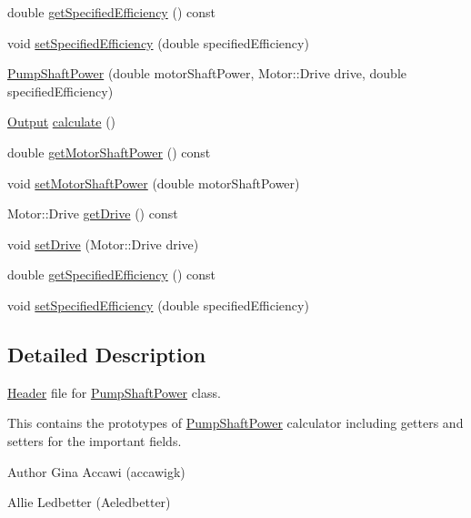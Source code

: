 \begin{DoxyCompactItemize}
\item 
double \hyperlink{class_pump_shaft_power_a93c70d2b6f70d6d98b97859fc095193a}{get\+Specified\+Efficiency} () const
\item 
void \hyperlink{class_pump_shaft_power_a7d2c64ba11fb287d9b46f7d0890ee988}{set\+Specified\+Efficiency} (double specified\+Efficiency)
\item 
\hyperlink{class_pump_shaft_power_a7eea468dbb3efe1f0e8ae77a2d16efe2}{Pump\+Shaft\+Power} (double motor\+Shaft\+Power, Motor\+::\+Drive drive, double specified\+Efficiency)
\item 
\hyperlink{struct_pump_shaft_power_1_1_output}{Output} \hyperlink{class_pump_shaft_power_a5398dac8dedd059b0eefdcfe8cdbda60}{calculate} ()
\item 
double \hyperlink{class_pump_shaft_power_acb91eadb960f946ffee5373d4839a5be}{get\+Motor\+Shaft\+Power} () const
\item 
void \hyperlink{class_pump_shaft_power_a77b8c621c7c92841dbd00112437c413b}{set\+Motor\+Shaft\+Power} (double motor\+Shaft\+Power)
\item 
Motor\+::\+Drive \hyperlink{class_pump_shaft_power_a382653196fd65562cd3823049ab7573a}{get\+Drive} () const
\item 
void \hyperlink{class_pump_shaft_power_a5cbcf0acd63ae4a2ffe9a5c13ba73a3a}{set\+Drive} (Motor\+::\+Drive drive)
\item 
double \hyperlink{class_pump_shaft_power_a93c70d2b6f70d6d98b97859fc095193a}{get\+Specified\+Efficiency} () const
\item 
void \hyperlink{class_pump_shaft_power_a7d2c64ba11fb287d9b46f7d0890ee988}{set\+Specified\+Efficiency} (double specified\+Efficiency)
\end{DoxyCompactItemize}


\subsection{Detailed Description}
\hyperlink{class_header}{Header} file for \hyperlink{class_pump_shaft_power}{Pump\+Shaft\+Power} class. 

This contains the prototypes of \hyperlink{class_pump_shaft_power}{Pump\+Shaft\+Power} calculator including getters and setters for the important fields.

\begin{DoxyAuthor}{Author}
Gina Accawi (accawigk) 

Allie Ledbetter (Aeledbetter) 
\end{DoxyAuthor}


